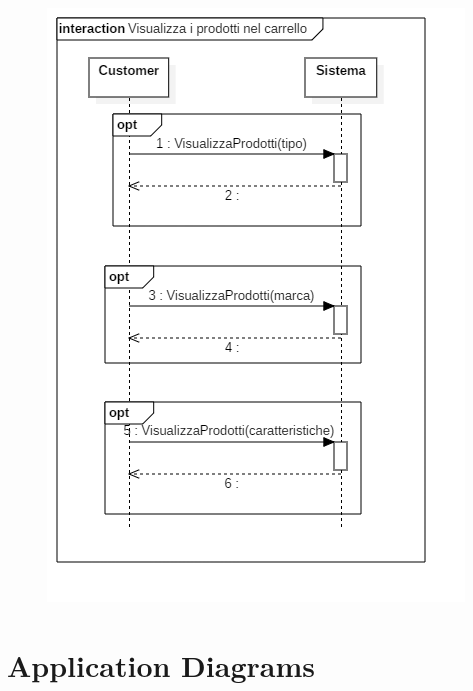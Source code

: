 \documentclass[12pt]{article}
\begin{document}
\begin{figure}[h!]
	\begin{center}
 	 	\includegraphics[keepaspectratio]{media/diagrams/sequence/visualizza_prodotti_carrello.png}
	\end{center}
\end{figure}


\section{Application Diagrams}
\end{document}
